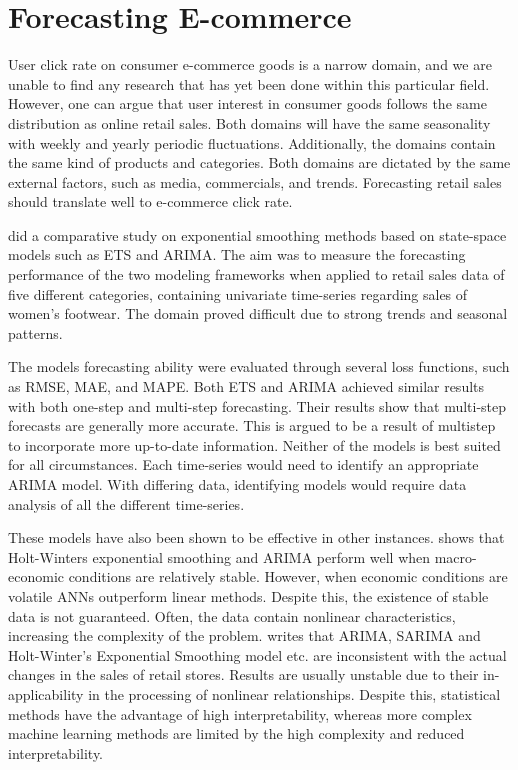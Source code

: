 \section{Forecasting E-commerce}
\label{section:RelatedWork:forecasting-ecommerce}

User click rate on consumer e-commerce goods is a narrow domain,
and we are unable to find any research that has yet been done within this particular field.
However, one can argue that user interest in consumer goods follows the same distribution
as online retail sales.
Both domains will have the same seasonality with weekly and yearly periodic fluctuations.
Additionally, the domains contain the same kind of products and categories.
Both domains are dictated by the same external factors, such as media, commercials,
and trends.
Forecasting retail sales should translate well to e-commerce click rate.


\cite{Ramos2015} did a comparative study on exponential smoothing methods
based on state-space models such as ETS and ARIMA.
The aim was to measure the forecasting performance of the two modeling frameworks
when applied to retail sales data of five different categories,
containing univariate time-series regarding sales of women's footwear.
The domain proved difficult due to strong trends and seasonal patterns.

The models forecasting ability were evaluated through several loss functions, such as RMSE, MAE, and MAPE.
Both ETS and ARIMA achieved similar results with both one-step and multi-step forecasting.
Their results show that multi-step forecasts are generally more accurate.
This is argued to be a result of multistep to incorporate more up-to-date information.
Neither of the models is best suited for all circumstances.
Each time-series would need to identify an appropriate ARIMA model.
With differing data, identifying models would require data analysis of all the different time-series.



These models have also been shown to be effective in other instances.
\cite{Chu2003} shows that Holt-Winters exponential smoothing and ARIMA perform well when macro-economic
conditions are relatively stable.
However, when economic conditions are volatile ANNs outperform linear methods.
Despite this, the existence of stable data is not guaranteed.
Often, the data contain nonlinear characteristics, increasing the complexity of the problem.
\cite{Weng2020} writes that ARIMA, SARIMA and Holt-Winter's
Exponential Smoothing model etc. are inconsistent with the actual changes in the sales
of retail stores.
Results are usually unstable due to their in-applicability
in the processing of nonlinear relationships.
Despite this, statistical methods have the advantage of high interpretability,
whereas more complex machine learning methods are limited by the high complexity and reduced interpretability.



